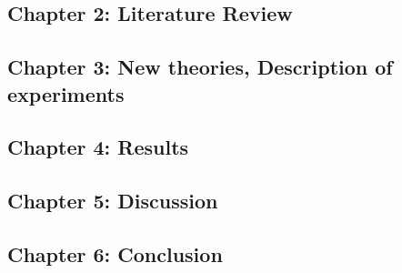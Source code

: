 \documentclass{article}
\begin{document}
	\subsection{Chapter 2: Literature Review}
	\subsection{Chapter 3: New theories, Description of experiments}
	\subsection{Chapter 4: Results}
	\subsection{Chapter 5: Discussion}
	\subsection{Chapter 6: Conclusion}
	
	
	
	
\end{document}
